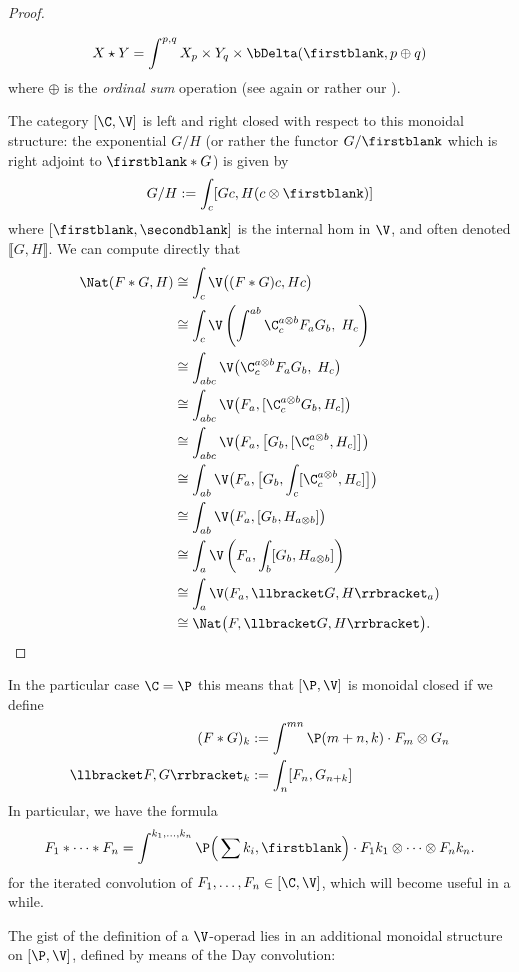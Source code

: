 \begin{proof}
\begin{example}
\[
X \star Y = \int^{p,q} X_p \times Y_q \times \bDelta(\firstblank, p\oplus q)
\]
where $\oplus$ is the \emph{ordinal sum} operation (see again \cite{Joy} or rather our ).
\end{example}
The category $[\C,\V]$ is left and right closed with respect to this monoidal structure: the exponential $G/H$ (or rather the functor $G/\firstblank$ which is right adjoint to $\firstblank\ast G$) is given by
\[
G/H := \int_c [Gc,H(c\otimes \firstblank)]
\]
where $[\firstblank,\secondblank]$ is the internal hom in $\V$, and often denoted $\llbracket G,H\rrbracket$. We can compute directly that
\begin{align*}
 \Nat(F\ast G,H) &\cong \int_c\V\big((F\ast G)c,Hc\big) \\
 &\cong \int_c {\V}\left(  \int^{ab}\C^{a\otimes b}_c F_a G_b,\;H_c \right)\\
&\cong  \int_{abc}{\V}\big( \C^{a\otimes b}_c F_a G_b,\;H_c \big) \\
&\cong  \int_{abc} {\V} \big(F_a, [\C^{a\otimes b}_c G_b,H_c]\big)\\
&\cong  \int_{abc} {\V} \big(F_a, \big[G_b,[\C^{a\otimes b}_c,H_c]\big]\big) \\
&\cong  \int_{ab} {\V} \big(F_a,  \big[G_b, \int_c [\C^{a\otimes b}_c,H_c]\big]\big)\\
&\cong \int_{ab} {\V} \big(F_a,[G_b,H_{a\otimes b}]\big) \\
&\cong \int_a {\V}\left(F_a, \int_b[G_b,H_{a\otimes b}]\right)\\
&\cong  \int_a {\V}(F_a,\llbracket G,H\rrbracket_a)\\
&\cong \Nat\big(F,\llbracket G,H\rrbracket\big).\qedhere
\end{align*}
\end{proof}
\begin{remark}
In the particular case $\C=\P$ this means that $[\P,\V]$ is monoidal closed if we define
\begin{align*}
\displaystyle (F\ast G)_k &:= \int^{mn}\P(m+n,k)\cdot F_m \otimes G_n\\
\displaystyle \llbracket F,G\rrbracket_k &:= \int_n [F_n, G_{n+k}]
\end{align*}
In particular, we have the formula
\[
F_1\ast\dots\ast F_n = \int^{k_1,\dots, k_n} \P\Big(\sum k_i,\firstblank\Big)\cdot F_1 k_1 \otimes \dots \otimes F_nk_n.
\]
for the iterated convolution of $F_1,\dots, F_n\in [\C, \V]$, which will become useful in a while.
\end{remark}
The gist of the definition of a $\V$-operad lies in an additional monoidal structure on $[\P,\V]$, defined by means of the Day convolution:
